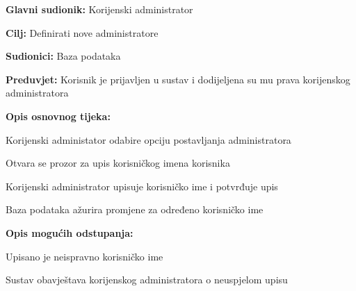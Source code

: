 					\noindent {}
					\begin{packed_item}
	
						\item \textbf{Glavni sudionik: }Korijenski administrator
						\item  \textbf{Cilj:} Definirati nove administratore
						\item  \textbf{Sudionici:} Baza podataka
						\item  \textbf{Preduvjet:} Korisnik je prijavljen u sustav i dodijeljena su mu prava korijenskog administratora
						\item  \textbf{Opis osnovnog tijeka:}
						
						\item[] \begin{packed_enum}
	
							\item Korijenski administator odabire opciju postavljanja administratora
							\item Otvara se prozor za upis korisničkog imena korisnika
							\item Korijenski administrator upisuje korisničko ime i potvrđuje upis
							\item Baza podataka ažurira promjene za određeno korisničko ime
						\end{packed_enum}

						\item  \textbf{Opis mogućih odstupanja:}
						
						\item[] \begin{packed_item}
	
							\item[3.a] Upisano je neispravno korisničko ime
							\item[] \begin{packed_enum}
								
								\item Sustav obavještava korijenskog administratora o neuspjelom upisu
								
							\end{packed_enum}
						\end{packed_item}
						
					\end{packed_item}

